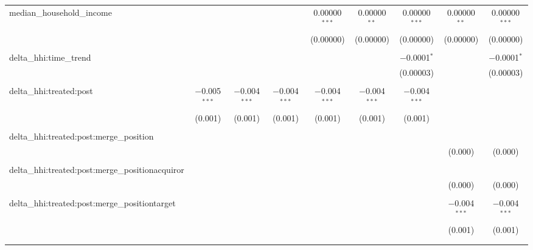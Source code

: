 \begin{table}[H]
{\begin{tabular}{@{\extracolsep{5pt}}lcccccccc}
  median\_household\_income &  &  &  & 0.00000$^{***}$ & 0.00000$^{**}$ & 0.00000$^{***}$ & 0.00000$^{**}$ & 0.00000$^{***}$ \\  

   &  &  &  & (0.00000) & (0.00000) & (0.00000) & (0.00000) & (0.00000) \\  

   & & & & & & & & \\  

  delta\_hhi:time\_trend &  &  &  &  &  & $-$0.0001$^{*}$ &  & $-$0.0001$^{*}$ \\  

   &  &  &  &  &  & (0.00003) &  & (0.00003) \\  

   & & & & & & & & \\  

  delta\_hhi:treated:post & $-$0.005$^{***}$ & $-$0.004$^{***}$ & $-$0.004$^{***}$ & $-$0.004$^{***}$ & $-$0.004$^{***}$ & $-$0.004$^{***}$ &  &  \\  

   & (0.001) & (0.001) & (0.001) & (0.001) & (0.001) & (0.001) &  &  \\  

   & & & & & & & & \\  

  delta\_hhi:treated:post:merge\_position &  &  &  &  &  &  &  &  \\  

   &  &  &  &  &  &  & (0.000) & (0.000) \\  

   & & & & & & & & \\  

  delta\_hhi:treated:post:merge\_positionacquiror &  &  &  &  &  &  &  &  \\  

   &  &  &  &  &  &  & (0.000) & (0.000) \\  

   & & & & & & & & \\  

  delta\_hhi:treated:post:merge\_positiontarget &  &  &  &  &  &  & $-$0.004$^{***}$ & $-$0.004$^{***}$ \\  

   &  &  &  &  &  &  & (0.001) & (0.001) \\  

   & & & & & & & & \\  

 \hline \\[-1.8ex]  


\end{tabular}}
\end{table}
